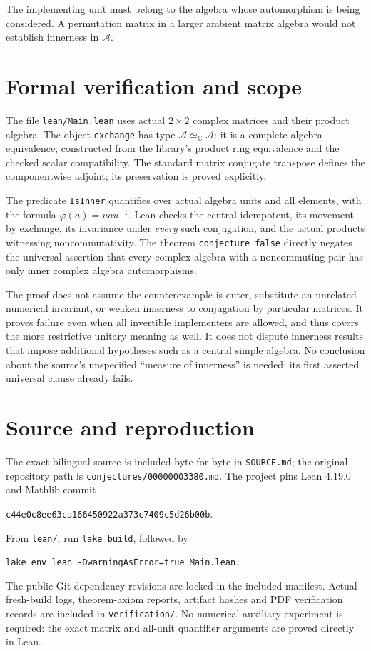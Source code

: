 \documentclass[11pt]{article}
\newcommand{\C}{\mathbb C}
\newcommand{\A}{\mathcal A}
\begin{document}
The implementing unit must belong to the algebra whose automorphism is
being considered. A permutation matrix in a larger ambient matrix
algebra would not establish innerness in $\A$.

\section*{Formal verification and scope}
The file \texttt{lean/Main.lean} uses actual $2\times2$ complex matrices
and their product algebra. The object \texttt{exchange} has type
$\A\simeq_{\C}\A$: it is a complete algebra equivalence, constructed
from the library's product ring equivalence and the checked scalar
compatibility. The standard matrix conjugate transpose defines the
componentwise adjoint; its preservation is proved explicitly.

The predicate \texttt{IsInner} quantifies over actual algebra units and
all elements, with the formula $\varphi(a)=uau^{-1}$. Lean checks the
central idempotent, its movement by exchange, its invariance under
\emph{every} such conjugation, and the actual products witnessing
noncommutativity. The theorem \texttt{conjecture\_false} directly negates
the universal assertion that every complex algebra with a noncommuting
pair has only inner complex algebra automorphisms.

The proof does not assume the counterexample is outer, substitute an
unrelated numerical invariant, or weaken innerness to conjugation by
particular matrices. It proves failure even when all invertible
implementers are allowed, and thus covers the more restrictive unitary
meaning as well. It does not dispute innerness results that impose
additional hypotheses such as a central simple algebra. No conclusion
about the source's unspecified ``measure of innerness'' is needed:
its first asserted universal clause already fails.

\section*{Source and reproduction}
The exact bilingual source is included byte-for-byte in \texttt{SOURCE.md};
the original repository path is \texttt{conjectures/00000003380.md}.
The project pins Lean 4.19.0 and Mathlib commit
\begin{center}\small\texttt{c44e0c8ee63ca166450922a373c7409c5d26b00b}.\end{center}
From \texttt{lean/}, run \texttt{lake build}, followed by
\begin{center}\small\texttt{lake env lean -DwarningAsError=true Main.lean}.\end{center}
The public Git dependency revisions are locked in the included manifest.
Actual fresh-build logs, theorem-axiom reports, artifact hashes and PDF
verification records are included in \texttt{verification/}.
No numerical auxiliary experiment is required: the exact matrix and
all-unit quantifier arguments are proved directly in Lean.
\end{document}
